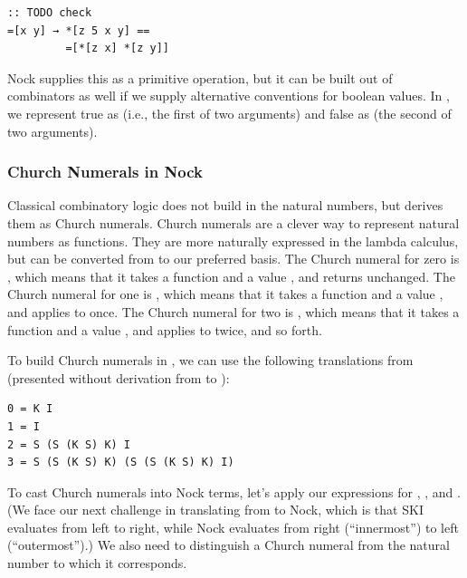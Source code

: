 \begin{lstlisting}[style=listingcomb,frame=tb]
:: TODO check
=[x y] → *[z 5 x y] ==
         =[*[z x] *[z y]]
\end{lstlisting}

Nock supplies this as a primitive operation, but it can be built out of combinators as well if we supply alternative conventions for boolean values.  In , we represent true as  (i.e., the first of two arguments) and false as  (the second of two arguments).





\subsubsection{Church Numerals in Nock}

Classical combinatory logic does not build in the natural numbers, but derives them as Church numerals.  Church numerals are a clever way to represent natural numbers as functions.  They are more naturally expressed in the lambda calculus, but can be converted from  to our preferred  basis.  The Church numeral for zero is , which means that it takes a function  and a value , and returns  unchanged.  The Church numeral for one is , which means that it takes a function  and a value , and applies  to  once.  The Church numeral for two is , which means that it takes a function  and a value , and applies  to  twice, and so forth.

To build Church numerals in , we can use the following translations from  (presented without derivation from  to ):

\begin{lstlisting}[style=listingcomb]
0 = K I
1 = I
2 = S (S (K S) K) I
3 = S (S (K S) K) (S (S (K S) K) I)
\end{lstlisting}

\noindent
To cast Church numerals into Nock terms, let's apply our expressions for , , and .  (We face our next challenge in translating from  to Nock, which is that \textsc{SKI} evaluates from left to right, while Nock evaluates from right (``innermost'') to left (``outermost'').)  We also need to distinguish a Church numeral from the natural number to which it corresponds.

